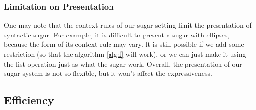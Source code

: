 \subsubsection{Limitation on Presentation}
One may note that the context rules of our sugar setting limit the presentation of syntactic sugar. For example, it is difficult to present a sugar with ellipses, because the form of its context rule may vary. It is still possible if we add some 
restriction (so that the algorithm \ref{alg:f} will work), or we can just make it using the list operation just as what the sugar  work. Overall, the presentation of our sugar system is not so flexible, but it won't affect the expressiveness. 

\subsection{Efficiency}

